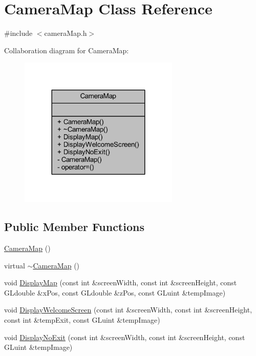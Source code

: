 \hypertarget{class_camera_map}{}\section{Camera\+Map Class Reference}
\label{class_camera_map}


{\ttfamily \#include $<$camera\+Map.\+h$>$}



Collaboration diagram for Camera\+Map\+:
\nopagebreak
\begin{figure}[H]
\begin{center}
\leavevmode
\includegraphics[width=216pt]{class_camera_map__coll__graph}
\end{center}
\end{figure}
\subsection*{Public Member Functions}
\begin{DoxyCompactItemize}
\item 
\hyperlink{class_camera_map_ab30d802ae5a9650bfd068eb9e2540616}{Camera\+Map} ()
\item 
virtual \hyperlink{class_camera_map_a033fac41221eaa5f74b60e92642c96c3}{$\sim$\+Camera\+Map} ()
\item 
void \hyperlink{class_camera_map_ae9310b2f4c46953742fc6a7e7f9358d4}{Display\+Map} (const int \&screen\+Width, const int \&screen\+Height, const G\+Ldouble \&x\+Pos, const G\+Ldouble \&z\+Pos, const G\+Luint \&temp\+Image)
\item 
void \hyperlink{class_camera_map_aa1f6b8bc540898135184b7081fdf2bff}{Display\+Welcome\+Screen} (const int \&screen\+Width, const int \&screen\+Height, const int \&temp\+Exit, const G\+Luint \&temp\+Image)
\item 
void \hyperlink{class_camera_map_ae282ccb9fd38101c1bf5ae560596561a}{Display\+No\+Exit} (const int \&screen\+Width, const int \&screen\+Height, const G\+Luint \&temp\+Image)
\end{DoxyCompactItemize}
